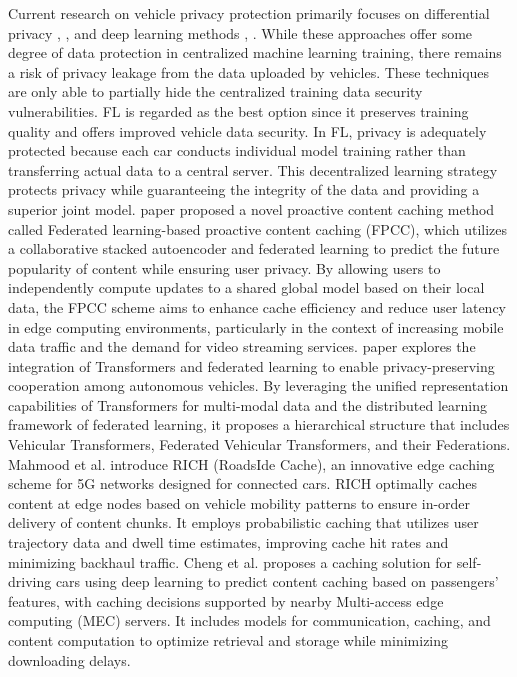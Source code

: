 \documentclass[journal]{IEEEtran}
\begin{document}
Current research on vehicle privacy protection primarily focuses on differential privacy \cite{r22}, \cite{r23}, and deep learning methods \cite{r24}, \cite{r35}. While these approaches offer some degree of data protection in centralized machine learning training, there remains a risk of privacy leakage from the data uploaded by vehicles. These techniques are only able to partially hide the centralized training data security vulnerabilities. FL is regarded as the best option since it preserves training quality and offers improved vehicle data security. In FL, privacy is adequately protected because each car conducts individual model training rather than transferring actual data to a central server. This decentralized learning strategy protects privacy while guaranteeing the integrity of the data and providing a superior joint model. \cite{r26} paper proposed a novel proactive content caching method called Federated learning-based proactive content caching (FPCC), which utilizes a collaborative stacked autoencoder and federated learning to predict the future popularity of content while ensuring user privacy. By allowing users to independently compute updates to a shared global model based on their local data, the FPCC scheme aims to enhance cache efficiency and reduce user latency in edge computing environments, particularly in the context of increasing mobile data traffic and the demand for video streaming services. \cite{r27} paper explores the integration of Transformers and federated learning to enable privacy-preserving cooperation among autonomous vehicles. By leveraging the unified representation capabilities of Transformers for multi-modal data and the distributed learning framework of federated learning, it proposes a hierarchical structure that includes Vehicular Transformers, Federated Vehicular Transformers, and their Federations. Mahmood et al. \cite{r28} introduce RICH (RoadsIde Cache), an innovative edge caching scheme for 5G networks designed for connected cars. RICH optimally caches content at edge nodes based on vehicle mobility patterns to ensure in-order delivery of content chunks. It employs probabilistic caching that utilizes user trajectory data and dwell time estimates, improving cache hit rates and minimizing backhaul traffic. Cheng et al. 
\cite{r30} proposes a caching solution for self-driving cars using deep learning to predict content caching based on passengers' features, with caching decisions supported by nearby Multi-access edge computing (MEC) servers. It includes models for communication, caching, and content computation to optimize retrieval and storage while minimizing downloading delays. 
\end{document}
